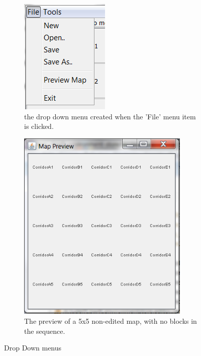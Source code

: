  \begin{figure}[h!]
        \centering
        \begin{subfigure}[b]{0.48\textwidth} %
	\center
	\includegraphics{EnvironmentStore/DropDownFile.png}
	\caption{the drop down menu created when the 'File' menu item is clicked.}
	\label{fig:DropDownFile}
        \end{subfigure}
        \begin{subfigure}[b]{0.48\textwidth}
	\center
	\includegraphics[width=0.9\textwidth]{EnvironmentStore/Preview.png}
	\caption{The preview of a 5x5 non-edited map, with no blocks in the sequence.}
	\label{fig:Preview}
        \end{subfigure}
        \caption{Drop Down menus}
\end{figure}


